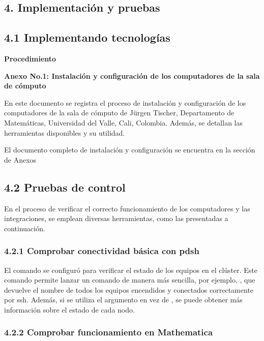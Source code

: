 \begin{spacing}{1.5}
\begin{tightcenter}
\section{4. Implementación y pruebas}
\mylinespacing
\end{tightcenter}

\subsection{4.1 Implementando tecnologías}

\textbf{Procedimiento}

\textbf{Anexo No.1: Instalación y configuración de los computadores de la sala de cómputo}

En este documento se registra el proceso de instalación y configuración de los computadores de la sala de cómputo de Jürgen Tischer, Departamento de Matemáticas, Universidad del Valle, Cali, Colombia. Además, se detallan las herramientas disponibles y su utilidad. 

El documento completo de instalación y configuración se encuentra en la sección de Anexos

\subsection{4.2 Pruebas de control}

En el proceso de verificar el correcto funcionamiento de los computadores y las integraciones, se emplean diversas herramientas, como las presentadas a continuación.

\subsubsection {4.2.1 Comprobar conectividad básica con pdsh}

El comando  se configuró para verificar el estado de los equipos en el clúster. Este comando permite lanzar un comando de manera más sencilla, por ejemplo, , que devuelve el nombre de todos los equipos encendidos y conectados correctamente por ssh. Además, si se utiliza el argumento  en vez de , se puede obtener más información sobre el estado de cada nodo. 

\subsubsection {4.2.2 Comprobar funcionamiento en Mathematica}


\end{spacing}
